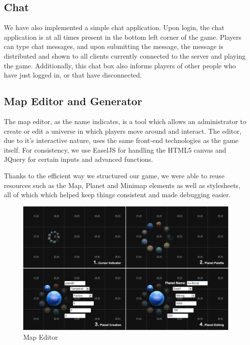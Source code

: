 \documentclass[a4paper,11pt]{article}
\begin{document}
			\pagebreak
			
		\subsection{Chat}
			We have also implemented a simple chat application. Upon login, the chat application is at all times present in the bottom left corner of the game. Players can type chat messages, and upon submitting the message, the message is distributed and shown to all clients currently connected to the server and playing the game. Additionally, this chat box also informs players of other people who have just logged in, or that have disconnected.
			
		\subsection{Map Editor and Generator}
		
		The map editor, as the name indicates, is a tool which allows an administrator to create or edit a universe in which players move around and interact. The editor, due to it's interactive nature, uses the same front-end technologies as the game itself. For consistency, we use EaselJS for handling the HTML5 canvas and JQuery for certain inputs and advanced functions.

		Thanks to the efficient way we structured our game, we were able to reuse resources such as the Map, Planet and Minimap elements as well as stylesheets, all of which which helped keep things consistent and made debugging easier.
		
		\begin{figure}[htb]
		\begin{center}
		\leavevmode
		\includegraphics[scale=0.6]{mapedit.png}
		\end{center}
		\caption{Map Editor}
		\label{fig:mapedit}
		\end{figure}
\end{document}
